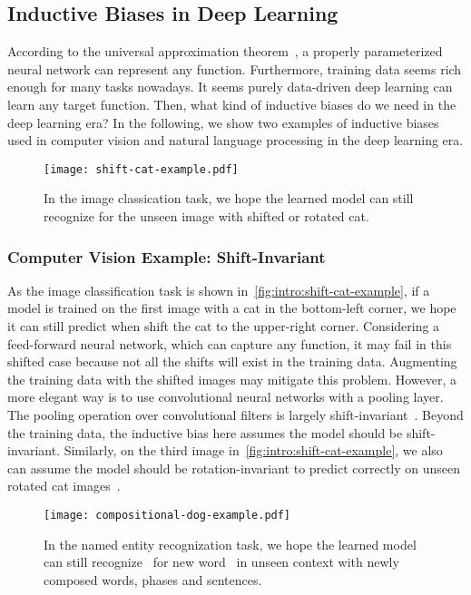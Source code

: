 \subsection{Inductive Biases in Deep Learning}
\label{ssec:intro:bias-source}
According to the universal approximation
theorem~\citep{hornik1989multilayer}, a properly parameterized neural
network can represent any function. Furthermore, training data seems
rich enough for many tasks nowadays. It seems purely data-driven deep
learning can learn any target function. Then, what kind of inductive
biases do we need in the deep learning era? In the following, we show two
examples of inductive biases used in computer vision and natural
language processing in the deep learning era.

\begin{figure}[!tbp]
  \centering
  \texttt{[image: shift-cat-example.pdf]}
  \caption{\label{fig:intro:shift-cat-example}In the image classication
    task, we hope the learned model can still recognize  for the
    unseen image with shifted or rotated cat.}
\end{figure}

\subsubsection{Computer Vision Example: Shift-Invariant}
\label{sssec:intro:cv-example}

As the image classification task is shown
in~\autoref{fig:intro:shift-cat-example}, if a model is trained on the
first image with a cat in the bottom-left corner, we hope it can still
predict  when shift the cat to the upper-right corner.
Considering a feed-forward neural network, which can capture any
function, it may fail in this shifted case because not all the shifts
will exist in the training data. Augmenting the training data with the
shifted images may mitigate this problem. However, a more elegant way
is to use convolutional neural networks with a pooling layer. The
pooling operation over convolutional filters is largely
shift-invariant~\citep{zhang2019making}. Beyond the training data, the
inductive bias here assumes the model should be shift-invariant.
Similarly, on the third image
in~\autoref{fig:intro:shift-cat-example}, we also can assume the model
should be rotation-invariant to predict correctly on unseen rotated
cat images~\citep{cheng2016rifd}.

\begin{figure}[!tbp]
  \centering
  \texttt{[image: compositional-dog-example.pdf]}
  \caption{\label{fig:intro:compositional-dog-example}In the named entity
    recognization task, we hope the learned model can still recognize
    ~for new word~ in unseen context with newly composed
    words, phases and sentences.}
\end{figure}

